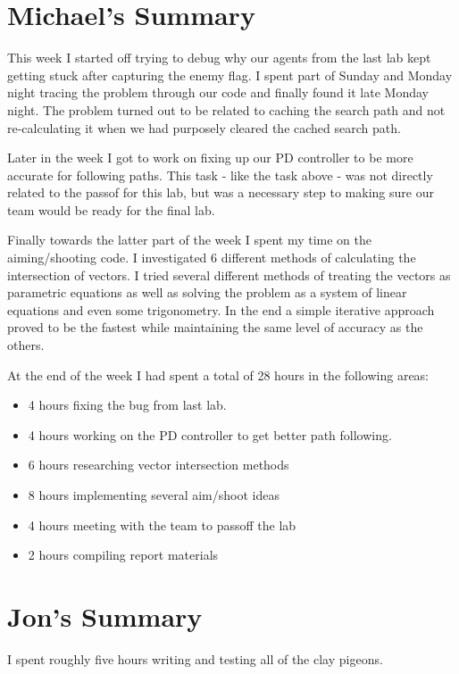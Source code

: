 \section{Michael's Summary}
This week I started off trying to debug why our agents from the last lab kept getting stuck after capturing the enemy flag. I spent part of Sunday and Monday night tracing the problem through our code
and finally found it late Monday night.  The problem turned out to be related to caching the search path
and not re-calculating it when we had purposely cleared the cached search path.
\par
Later in the week I got to work on fixing up our PD controller to be more accurate for following paths.  This task - like the task above - was not directly related to the passof for this lab, but was a necessary step to making sure our team would be ready for the final lab.
\par
Finally towards the latter part of the week I spent my time on the aiming/shooting code.  I investigated 6 different methods of calculating the intersection of vectors.  I tried several different methods of treating the vectors as parametric equations as well as solving the problem as a system of linear equations and even some trigonometry.  In the end a simple iterative approach proved to be the fastest while maintaining the same level of accuracy as the others.
\par
At the end of the week I had spent a total of 28 hours in the following areas:
\begin{itemize}
    \item 4 hours fixing the bug from last lab.
    \item 4 hours working on the PD controller to get better path following.
    \item 6 hours researching vector intersection methods
    \item 8 hours implementing several aim/shoot ideas
    \item 4 hours meeting with the team to passoff the lab
    \item 2 hours compiling report materials
\end{itemize}

\section{Jon's Summary}
I spent roughly five hours writing and testing all of the clay pigeons.